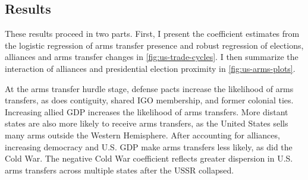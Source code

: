 \documentclass[12pt]{article}
\begin{document}
\subsection{Results}


These results proceed in two parts.
First, I present the coefficient estimates from the logistic regression of arms transfer presence and robust regression of elections, alliances and arms transfer changes in \autoref{fig:us-trade-cycles}.
I then summarize the interaction of alliances and presidential election proximity in \autoref{fig:us-arms-plots}.


At the arms transfer hurdle stage, defense pacts increase the likelihood of arms transfers, as does contiguity, shared IGO membership, and former colonial ties.
Increasing allied GDP increases the likelihood of arms transfers.
More distant states are also more likely to receive arms transfers, as the United States sells many arms outside the Western Hemisphere. 
After accounting for alliances, increasing democracy and U.S. GDP make arms transfers less likely, as did the Cold War. 
The negative Cold War coefficient reflects greater dispersion in U.S. arms transfers across multiple states after the USSR collapsed.
\end{document}
